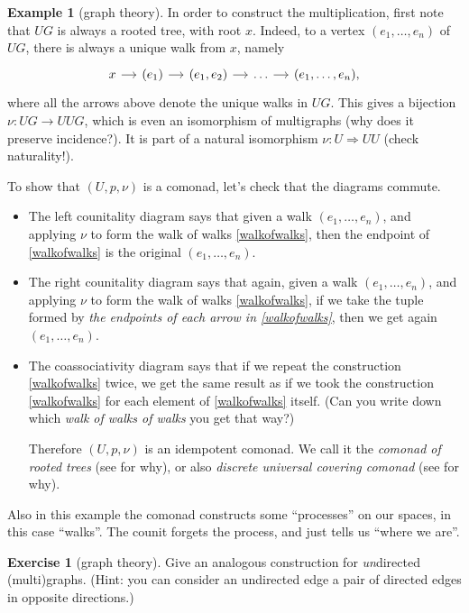 \documentclass[12pt,oneside,headings=small]{scrbook}
\numberwithin{equation}{section}
\theoremstyle{plain}
\theoremstyle{definition}
\newtheorem{eg}[thm]{Example}
\newtheorem{ex}[thm]{Exercise}
\newcommand{\ar}[2][]{\arrow{#2}{#1}}
\DeclareMathOperator{\1}{\mathbbm{1}}
\DeclareMathOperator{\2}{\mathbbm{2}}
\begin{document}
\begin{eg}[graph theory]
 In order to construct the multiplication, first note that $UG$ is always a rooted tree, with root $x$. Indeed, to a vertex $(e_1,\dots,e_n)$ of $UG$, there is always a unique walk from $x$, namely
 \begin{equation}\label{walkofwalks}
 \begin{tikzcd}[sep=small]
  x \ar{r} & (e_1) \ar{r} & (e_1,e_2) \ar{r} &\dots \ar{r} & (e_1,\dots,e_n) ,
 \end{tikzcd}
 \end{equation}
 where all the arrows above denote the unique walks in $UG$.
 This gives a bijection $\nu:UG\to UUG$,
 which is even an isomorphism of multigraphs (why does it preserve incidence?). It is part of a natural isomorphism $\nu:U\Rightarrow UU$ (check naturality!).
 
 To show that $(U,p,\nu)$ is a comonad, let's check that the diagrams  commute. 
 \begin{itemize}
  \item The left counitality diagram says that given a walk $(e_1,\dots,e_n)$, and applying $\nu$ to form the walk of walks \eqref{walkofwalks},
  then the endpoint of \eqref{walkofwalks} is the original $(e_1,\dots,e_n)$.
  \item The right counitality diagram says that again, given a walk $(e_1,\dots,e_n)$, and applying $\nu$ to form the walk of walks \eqref{walkofwalks}, if we take the tuple formed by \emph{the endpoints of each arrow in \eqref{walkofwalks}}, then we get again $(e_1,\dots,e_n)$.
  \item The coassociativity diagram says that if we repeat the construction \eqref{walkofwalks} twice, we get the same result as if we took the construction \eqref{walkofwalks} for each element of \eqref{walkofwalks} itself. (Can you write down which \emph{walk of walks of walks} you get that way?)
  
  Therefore $(U,p,\nu)$ is an idempotent comonad. We call it the \emph{comonad of rooted trees} (see  for why), or also \emph{discrete universal covering comonad} (see  for why). 
 \end{itemize}
\end{eg}

Also in this example the comonad constructs some ``processes'' on our spaces, in this case ``walks''. The counit forgets the process, and just tells us ``where we are''.

\begin{ex}[graph theory]\label{ucugraph}
 Give an analogous construction for \emph{un}directed (multi)graphs. (Hint: you can consider an undirected edge a pair of directed edges in opposite directions.)
\end{ex}
\end{document}
